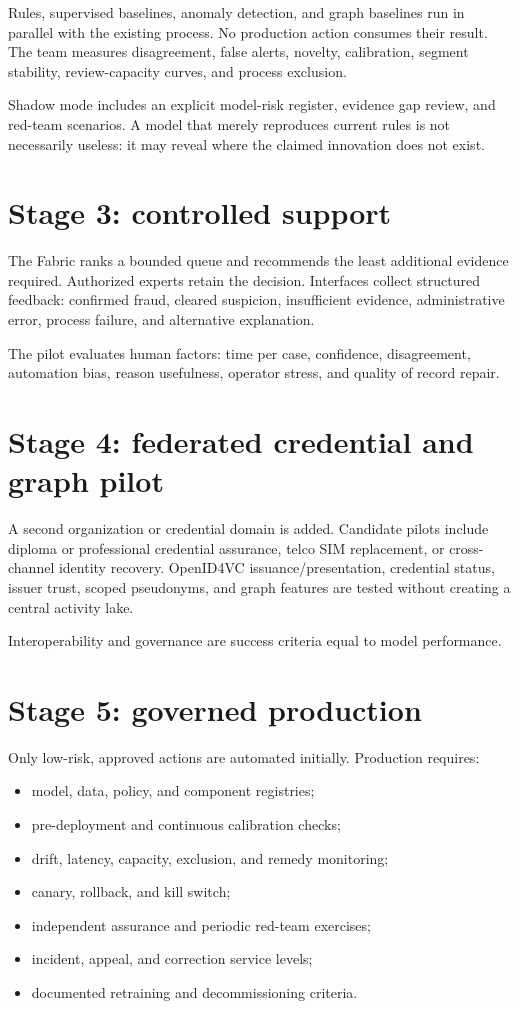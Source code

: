 Rules, supervised baselines, anomaly detection, and graph baselines run in parallel with the existing process. No production action consumes their result. The team measures disagreement, false alerts, novelty, calibration, segment stability, review-capacity curves, and process exclusion.

Shadow mode includes an explicit model-risk register, evidence gap review, and red-team scenarios. A model that merely reproduces current rules is not necessarily useless: it may reveal where the claimed innovation does not exist.

\section{Stage 3: controlled support}

The Fabric ranks a bounded queue and recommends the least additional evidence required. Authorized experts retain the decision. Interfaces collect structured feedback: confirmed fraud, cleared suspicion, insufficient evidence, administrative error, process failure, and alternative explanation.

The pilot evaluates human factors: time per case, confidence, disagreement, automation bias, reason usefulness, operator stress, and quality of record repair.

\section{Stage 4: federated credential and graph pilot}

A second organization or credential domain is added. Candidate pilots include diploma or professional credential assurance, telco SIM replacement, or cross-channel identity recovery. OpenID4VC issuance/presentation, credential status, issuer trust, scoped pseudonyms, and graph features are tested without creating a central activity lake.

Interoperability and governance are success criteria equal to model performance.

\section{Stage 5: governed production}

Only low-risk, approved actions are automated initially. Production requires:

\begin{itemize}
\item model, data, policy, and component registries;
\item pre-deployment and continuous calibration checks;
\item drift, latency, capacity, exclusion, and remedy monitoring;
\item canary, rollback, and kill switch;
\item independent assurance and periodic red-team exercises;
\item incident, appeal, and correction service levels;
\item documented retraining and decommissioning criteria.
\end{itemize}

